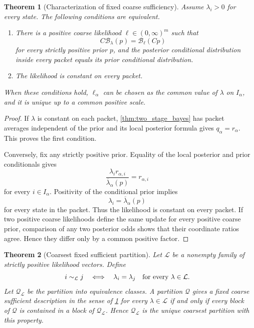 \documentclass{aomart}
\newtheorem{theorem}{Theorem}[section]
\theoremstyle{definition}
\theoremstyle{remark}
\newcommand{\Bcal}{\mathcal B}
\begin{document}
\begin{theorem}[Characterization of fixed coarse sufficiency]\label{thm:bayesian_sufficiency}
Assume \(\lambda_i>0\) for every state. The following conditions are equivalent.
\begin{enumerate}
\item There is a positive coarse likelihood \(\ell\in(0,\infty)^m\) such that
\[
C\Bcal_\lambda(p)
=
\Bcal_\ell(Cp)
\]
for every strictly positive prior \(p\), and the posterior conditional distribution inside every packet equals its prior conditional distribution.
\item The likelihood is constant on every packet.
\end{enumerate}
When these conditions hold, \(\ell_\alpha\) can be chosen as the common value of \(\lambda\) on \(I_\alpha\), and it is unique up to a common positive scale.
\end{theorem}

\begin{proof}
If \(\lambda\) is constant on each packet, \cref{thm:two_stage_bayes} has packet averages independent of the prior and its local posterior formula gives \(q_\alpha=r_\alpha\). This proves the first condition.

Conversely, fix any strictly positive prior. Equality of the local posterior and prior conditionals gives
\[
\frac{\lambda_i r_{\alpha,i}}
{\overline\lambda_\alpha(p)}
=
r_{\alpha,i}
\]
for every \(i\in I_\alpha\). Positivity of the conditional prior implies
\[
\lambda_i=\overline\lambda_\alpha(p)
\]
for every state in the packet. Thus the likelihood is constant on every packet. If two positive coarse likelihoods define the same update for every positive coarse prior, comparison of any two posterior odds shows that their coordinate ratios agree. Hence they differ only by a common positive factor.
\end{proof}

\begin{theorem}[Coarsest fixed sufficient partition]\label{thm:coarsest_bayesian_partition}
Let \(\mathcal L\) be a nonempty family of strictly positive likelihood vectors. Define
\[
i\sim_{\mathcal L}j
\quad\Longleftrightarrow\quad
\lambda_i=\lambda_j
\quad\hbox{for every }\lambda\in\mathcal L.
\]
Let \(\mathcal Q_{\mathcal L}\) be the partition into equivalence classes. A partition \(\mathcal Q\) gives a fixed coarse sufficient description in the sense of \cref{thm:bayesian_sufficiency} for every \(\lambda\in\mathcal L\) if and only if every block of \(\mathcal Q\) is contained in a block of \(\mathcal Q_{\mathcal L}\). Hence \(\mathcal Q_{\mathcal L}\) is the unique coarsest partition with this property.
\end{theorem}
\end{document}

